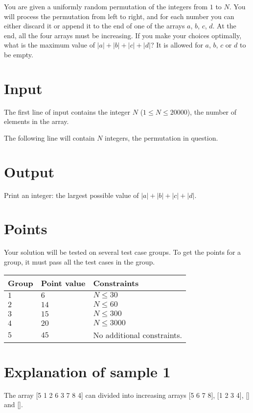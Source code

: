 \noindent

You are given a uniformly random permutation of the integers from $1$ to $N$.
You will process the permutation from left to right, and for each number
you can either discard it or append it to the end of one of
the arrays $a$, $b$, $c$, $d$. At the end, all the four arrays must
be increasing. If you make your choices optimally, what is the maximum
value of $|a|+|b|+|c|+|d|$? It is allowed for $a$, $b$, $c$ or $d$ to
be empty.

\section*{Input}
The first line of input contains the integer $N$ ($1 \leq N \leq 20000$),
the number of elements in the array.

The following line will contain $N$ integers, the permutation in question.


\section*{Output}
Print an integer: the largest possible value of $|a|+|b|+|c|+|d|$.


\section*{Points}
Your solution will be tested on several test case groups. To get the points for
a group, it must pass all the test cases in the group.

\noindent
\begin{tabular}{| l | l | p{12cm} |}
  \hline
  \textbf{Group} & \textbf{Point value} & \textbf{Constraints} \\ \hline
  $1$    & $6$        & $N \leq 30$ \\ \hline
  $2$    & $14$       & $N \leq 60$ \\ \hline
  $3$    & $15$       & $N \leq 300$ \\ \hline
  $4$    & $20$       & $N \leq 3000$ \\ \hline
  $5$    & $45$       & No additional constraints. \\ \hline
\end{tabular}

\section*{Explanation of sample 1}
The array [5 1 2 6 3 7 8 4] can divided into increasing arrays [5 6 7 8], [1 2 3 4], [] and [].

